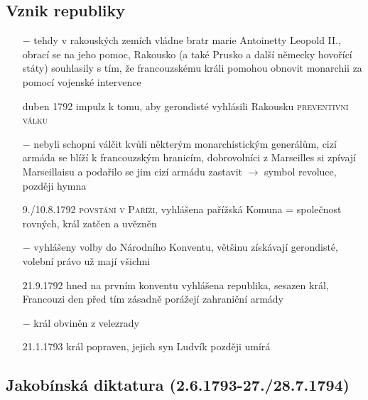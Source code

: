 \documentclass{article}
\begin{document}
\subsection*{Vznik republiky}
\begin{itemize}
    \vspace{-0.5em}
    \setlength\itemsep{0.15em}
    \item[$-$] tehdy v rakouských zemích vládne bratr marie Antoinetty Leopold II., obrací se na jeho pomoc, Rakousko (a také Prusko a další německy hovořící státy) souhlasily s tím, že francouzskému králi pomohou obnovit monarchii za pomocí vojenské intervence
    \item[duben 1792] impulz k tomu, aby gerondisté vyhlásili Rakousku \textsc{preventivní válku}
    \item[$-$] nebyli schopni válčit kvůli některým monarchistickým generálům, cizí armáda se blíží k francouzským hranicím, dobrovolníci z Marseilles si zpívají Marseillaisu a podařilo se jim cizí armádu zastavit $\rightarrow$ symbol revoluce, později hymna
    \item[9./10.8.1792] \textsc{povstání v Paříži}, vyhlášena pařížská Komuna = společnost rovných, král zatčen a uvězněn
    \item[$-$] vyhlášeny volby do Národního Konventu, většinu získávají gerondisté, volební právo už mají všichni
    \item[21.9.1792] hned na prvním konventu vyhlášena republika, sesazen král, Francouzi den před tím zásadně porážejí zahraniční armády
    \item[$-$] král obviněn z velezrady
    \item[21.1.1793] král popraven, jejich syn Ludvík později umírá
\end{itemize}
\subsection*{Jakobínská diktatura (2.6.1793-27./28.7.1794)}
\end{document}
